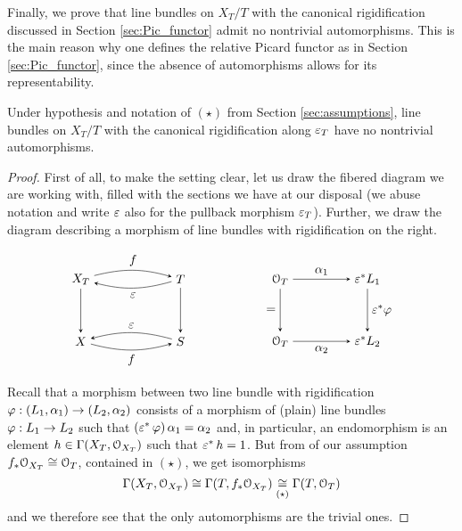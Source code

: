	Finally, we prove that line bundles on $X_T/T$ with the canonical rigidification discussed in Section \ref{sec:Pic_functor} admit no nontrivial automorphisms. This is the main reason why one defines the relative Picard functor as in Section \ref{sec:Pic_functor}, since the absence of automorphisms allows for its representability.
	\begin{prop}\label{prop:rigid}
		Under hypothesis and notation of $(\star)$ from Section \ref{sec:assumptions}, line bundles on $X_T/T$ with the canonical rigidification along $\varepsilon_T$ have no nontrivial automorphisms. 
	\end{prop}
	\begin{proof}
		First of all, to make the setting clear, let us draw the fibered diagram we are working with, filled with the sections we have at our disposal (we  abuse notation and write $\varepsilon$ also for the pullback morphism $\varepsilon_T$). Further, we draw the diagram describing a morphism of line bundles with rigidification on the right.
		
		\begin{equation*}
		\begin{tikzpicture}[node distance=5em, auto] %
			\node (A) 															{$X_T$};
			\node (B) 	[right of=A, xshift=3em]		{$T$};
		  \node (C) 	[below of=A] 								{$X$};
		  \node (D) 	[right of=C, xshift=3em] 		{$S$};
		 	\node (A2) 	[right of=B, xshift=3em]			{$\calO_T$};
			\node (B2) 	[right of=A2, xshift=2em]			{$\eps^*L_1$};
		  \node (C2) 	[below of=A2] 								{$\calO_T$};
		  \node (D2) 	[right of=C2, xshift=2em] 		{$\eps^*L_2$};
		  \draw[-stealth, bend left=15, looseness=1]						(A)		to node {$f$} 			(B);
		  \draw[-stealth, bend left=15, looseness=1]						(B)		to node {$\eps$} 	(A);
		  \draw[-stealth]																				(A)		to node {} (C);
		  \draw[-stealth]																				(B)		to node {} (D);
		  \draw[-stealth, bend right=15, looseness=1, swap]			(D)		to node {$\eps$}		(C);
		  \draw[-stealth, bend right=15, looseness=1, swap]			(C)		to node {$f$} 			(D);
		  \draw[-stealth]						(A2)		to node {$\al_1$} 				(B2);
		  \draw[-stealth, swap]			(A2)		to node {$=$} 						(C2);
		  \draw[-stealth]						(B2)		to node {$\eps^*\ph$} 	(D2);
		  \draw[-stealth, swap]			(C2)		to node {$\al_2$}					(D2);
		\end{tikzpicture}
		\end{equation*}
		
		Recall that a morphism between two line bundle with rigidification $\varphi:(L_1,\alpha_1) \to (L_2,\alpha_2)$ consists of a morphism of (plain) line bundles $\varphi:L_1\to L_2$ such that $(\varepsilon^* \,\varphi)\,\alpha_1 = \alpha_2$ and, in particular, an endomorphism is an element $h\in \Gamma(X_T, \mathcal{O}_{X_T})$ such that $\varepsilon^* \,h = 1$. But from of our assumption $f_*\mathcal{O}_{X_T} \cong \mathcal{O}_T$, contained in $(\star)$, we get isomorphisms
		$$ \Gamma(X_T, \mathcal{O}_{X_T}) \cong \Gamma(T, f_*\mathcal{O}_{X_T}) \underset{(\star)}\cong \Gamma(T, \mathcal{O}_{T}) $$
		and we therefore see that the only automorphisms are the trivial ones.
	\end{proof}

